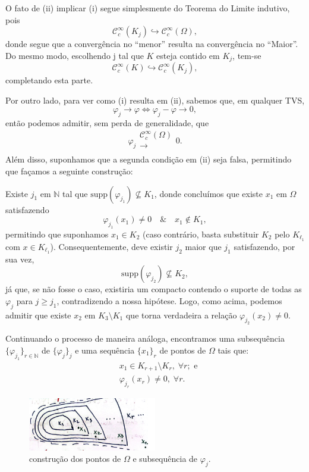 \documentclass[../distribution_theory_notes.tex]{subfiles}
\begin{document}
\begin{proof*}
	O fato de (ii) implicar (i) segue simplesmente  do Teorema do Limite indutivo, pois
	\[
		\mathcal{C}_{c}^{\infty}(K_{j})\hookrightarrow \mathcal{C}_{c}^{\infty}(\Omega ),
	\]
	donde segue que a convergência no ``menor'' resulta na convergência no ``Maior''. Do mesmo modo, escolhendo j tal que \(K\) esteja contido em \(K_{j}\), tem-se
	\[
		\mathcal{C}_{c}^{\infty}(K)\hookrightarrow \mathcal{C}_{c}^{\infty}(K_{j}),
	\]
	completando esta parte.

	Por outro lado, para ver como (i) resulta em (ii), sabemos que, em qualquer TVS,
	\[
		\varphi_{j}\rightarrow \varphi  \Longleftrightarrow \varphi_{j}-\varphi \rightarrow 0,
	\]
	então podemos admitir, sem perda de generalidade, que
	\[
		\varphi_{j}\substack{\mathcal{C}_{c}^{\infty}(\Omega ) \\ \longrightarrow \\ }0.
	\]
	Além disso, suponhamos que a segunda condição em (ii) seja falsa, permitindo que façamos a seguinte construção:

	Existe \(j_1\) em \(\mathbb{N}\) tal que \(\mathrm{supp}(\varphi_{j_1})\not\subseteq K_1\), donde concluímos que existe \(x_1\) em \(\Omega \) satisfazendo
	\[
		\varphi_{j_1}(x_1)\neq 0 \quad\&\quad x_1\not\in K_1,
	\]
	permitindo que suponhamos \(x_1\in K_2\) (caso contrário, basta substituir \(K_2\) pelo \(K_{\ell_1}\) com \(x\in K_{\ell_1}\)). Consequentemente, deve existir \(j_2\) maior que \(j_1\) satisfazendo, por sua vez,
	\[
		\mathrm{supp}(\varphi_{j_2})\not\subseteq K_2,
	\]
	já que, se não fosse o caso, existiria um compacto contendo o suporte de todas as \(\varphi_{j}\) para \(j\geq j_1\), contradizendo a nossa hipótese. Logo, como acima, podemos admitir que existe \(x_2\) em \(K_3\setminus{K_1}\) que torna verdadeira a relação \(\varphi_{j_2}(x_2)\neq 0\).

	Continuando o processo de maneira análoga, encontramos uma subsequência \(\{\varphi_{j_1}\}_{r\in \mathbb{N}}\) de \(\{\varphi_{j}\}_{j}\) e uma sequência \(\{x_1\}_{r}\) de pontos de \(\Omega \) tais que:
	\begin{align*}
		 & x_1\in K_{r+1}\setminus{K_r},\; \forall r; \text{ e} \\
		 & \varphi_{j_r}(x_r)\neq 0,\; \forall r.
	\end{align*}
	\begin{figure}[H]
		\begin{center}
			\includegraphics[height=0.5\textheight, width=0.5\textwidth, keepaspectratio]{./Images/points_construction_06.png}
		\end{center}
		\caption{construção dos pontos de \(\Omega \) e subsequência de \({\varphi_{j}}\).}
	\end{figure}


\end{proof*}
\end{document}
